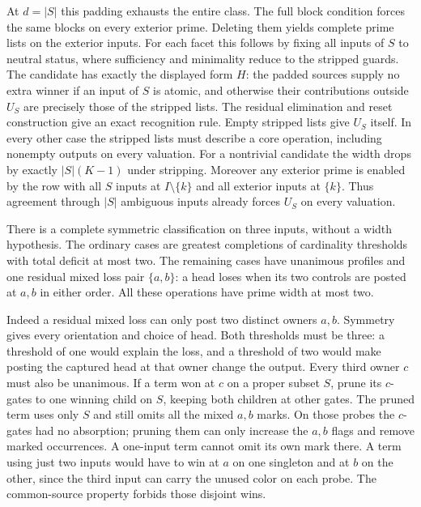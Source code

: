 At $d=|S|$ this padding exhausts the entire class. The full
block condition forces the same blocks on every exterior
prime. Deleting them yields complete prime lists on
the exterior inputs. For each facet this follows by fixing
all inputs of $S$ to neutral status, where sufficiency and
minimality reduce to the stripped guards. The candidate
has exactly the displayed form $H$: the padded sources
supply no extra winner if an input of $S$ is atomic, and
otherwise their contributions outside $U_S$ are precisely
those of the stripped lists. The residual elimination and
reset construction give an exact recognition rule. Empty
stripped lists give $U_S$ itself. In every other case the
stripped lists must describe a core operation, including
nonempty outputs on every valuation. For a nontrivial
candidate the width drops by exactly $|S|(K-1)$ under
stripping. Moreover any exterior prime is enabled by the
row with all $S$ inputs at $I\setminus\{k\}$ and all
exterior inputs at $\{k\}$. Thus agreement through
$|S|$ ambiguous inputs already forces $U_S$ on every
valuation.

There is a complete symmetric classification on three inputs,
without a width hypothesis. The ordinary cases are greatest
completions of cardinality thresholds with total deficit at
most two. The remaining cases have unanimous profiles and
one residual mixed loss pair $\{a,b\}$: a head loses when its
two controls are posted at $a,b$ in either order. All these
operations have prime width at most two.

Indeed a residual mixed loss can only post two distinct
owners $a,b$. Symmetry gives every orientation and choice
of head. Both thresholds must be three: a threshold of one
would explain the loss, and a threshold of two would make
posting the captured head at that owner change the output.
Every third owner $c$ must also be unanimous. If a term won
at $c$ on a proper subset $S$, prune its $c$-gates to one
winning child on $S$, keeping both children at other gates.
The pruned term uses only $S$ and still omits all the mixed
$a,b$ marks. On those probes the $c$-gates had no absorption;
pruning them can only increase the $a,b$ flags and remove
marked occurrences. A one-input term cannot omit its own
mark there. A term using just two inputs would have to win
at $a$ on one singleton and at $b$ on the other, since the
third input can carry the unused color on each probe.
The common-source property forbids those disjoint wins.

